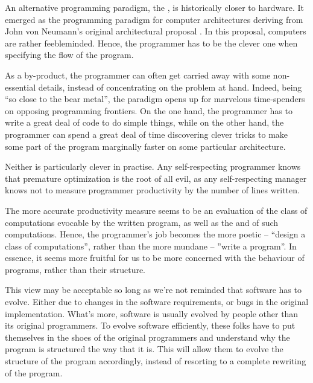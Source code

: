 An alternative programming paradigm, the , is historically
closer to hardware. It emerged as the programming paradigm for computer
architectures deriving from John von Neumann's original architectural proposal
\cite{von-neumann}. In this proposal, computers are rather feebleminded.
Hence, the programmer has to be the clever one when specifying the flow of the
program.


As a by-product, the programmer can often get carried away with some
non-essential details, instead of concentrating on the problem at hand. Indeed,
being ``so close to the bear metal'', the paradigm opens up for marvelous
time-spenders on opposing programming frontiers. On the one hand, the
programmer has to write a great deal of code to do simple things, while on the
other hand, the programmer can spend a great deal of time discovering clever
tricks to make some part of the program marginally faster on some particular
architecture.

Neither is particularly clever in practise. Any self-respecting programmer
knows that premature optimization is the root of all evil\cite{knuth-goto}, as
any self-respecting manager knows not to measure programmer productivity by the
number of lines written.


The more accurate productivity measure seems to be an evaluation of the class
of computations evocable by the written program, as well as the  and
  of such computations. Hence, the programmer's
job becomes the more poetic -- ``design a class of computations'', rather than
the more mundane -- ''write a program''. In essence, it seems more fruitful for
us to be more concerned with the behaviour of programs, rather than their
structure.

This view may be acceptable so long as we're not reminded that software has to
evolve. Either due to changes in the software requirements, or bugs in the
original implementation. What's more, software is usually evolved by people
other than its original programmers. To evolve software efficiently, these
folks have to put themselves in the shoes of the original programmers and
understand why the program is structured the way that it is.  This will allow
them to evolve the structure of the program accordingly, instead of resorting
to a complete rewriting of the program.

